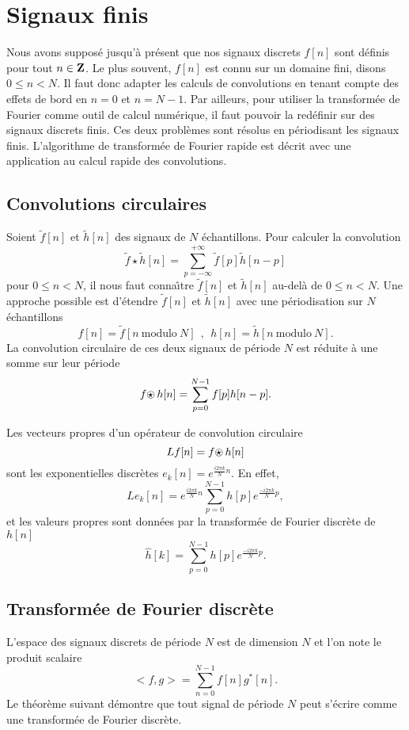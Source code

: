 \section{Signaux finis}
\label{finite-sig}
Nous avons suppos\'e jusqu'\`a pr\'esent que nos signaux discrets
$f[n]$ sont d\'efinis pour tout $n \in {\bf{Z}}$. Le plus souvent,
$f[n]$ est connu sur un domaine fini, disons $0 \leq n < N$.
Il faut donc adapter les calculs de convolutions en tenant
compte des effets de bord en $n=0$ et $n= N-1$.
Par ailleurs, pour utiliser la transform\'ee de Fourier comme outil
de calcul num\'erique, il faut pouvoir la red\'efinir sur des
signaux discrets finis.
Ces deux probl\`emes sont r\'esolus en p\'eriodisant les
signaux finis. L'algorithme de transform\'ee de Fourier
rapide est d\'ecrit avec une application au calcul rapide
des convolutions.


\subsection{Convolutions circulaires}

Soient $\tilde f[n]$ et $\tilde h[n]$ des signaux de $N$
\'echantillons.
Pour calculer la convolution
\[
\tilde f \star \tilde h [n] = \sum_{p=-\infty}^{+\infty}
\tilde f[p] \tilde h[n-p]
\]
pour $0 \leq n < N$, il nous faut conna\^{\i}tre
$\tilde f[n]$ et $\tilde h[n]$ au-del\`a de $0 \leq n < N$.
Une approche possible est d'\'etendre
$\tilde f[n]$ et $\tilde h[n]$ avec une p\'eriodisation
sur $N$ \'echantillons
\[
f[n] =  \tilde f[n ~\mbox{modulo}~ N]
~~,~~
h[n] =  \tilde h[n ~\mbox{modulo}~ N] .
\]
La convolution circulaire de ces deux signaux de p\'eriode $N$
est r\'eduite \`a une somme sur leur p\'eriode
\[
f {\mbox{$\odot \!\!\!\!\star~$}} h [n]
= \sum_{p=0}^{N-1}
f[p] h[n-p] .
\]

Les vecteurs propres d'un op\'erateur de convolution circulaire
\[
Lf[n] = f {\mbox{$\odot \!\!\!\!\star~$}} h[n]
\]
sont les exponentielles discr\`etes
$e_k[n] = e^{ \frac {i2 \pi k} N n  }$.
En effet,
\[
L e_k [n] = e^{ \frac {i2 \pi k} N n  }
\sum_{p=0}^{N-1}
h[p]  e^{ \frac {-i2 \pi k} N p  },
\]
et les valeurs propres sont donn\'ees par la
transform\'ee de Fourier discr\`ete de $h[n]$
\[
\hat h[k] = \sum_{p=0}^{N-1}
h[p]  e^{ \frac {-i2 \pi k} N p  } .
\]

\subsection{Transform\'ee de Fourier discr\`ete}
\label{transf-four-discr}

L'espace des signaux discrets
de p\'eriode $N$ est de dimension $N$ et l'on note le produit
scalaire
\begin{equation}
\label{inn-prod}
<f,g> = \sum_{n=0} ^{N-1} f[n]  g^*[n] .
\end{equation}
Le th\'eor\`eme suivant d\'emontre que tout signal
de p\'eriode $N$ peut s'\'ecrire comme une transform\'ee de
Fourier discr\`ete.

